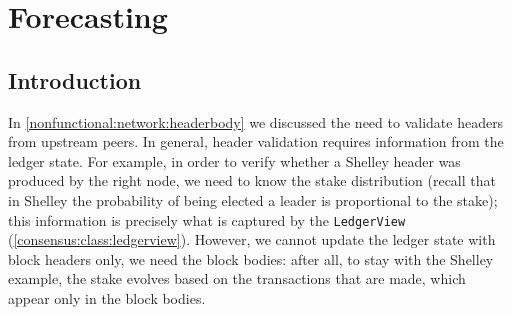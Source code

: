 \section{Forecasting}
\label{ledger:forecasting}

\subsection{Introduction}

In \cref{nonfunctional:network:headerbody} we discussed the need to validate
headers from upstream peers. In general, header validation requires information
from the ledger state. For example, in order to verify whether a Shelley header
was produced by the right node, we need to know the stake distribution (recall
that in Shelley the probability of being elected a leader is proportional to the
stake); this information is precisely what is captured by the
\lstinline!LedgerView! (\cref{consensus:class:ledgerview}). However, we cannot
update the ledger state with block headers only, we need the block bodies: after
all, to stay with the Shelley example, the stake evolves based on the
transactions that are made, which appear only in the block bodies.


